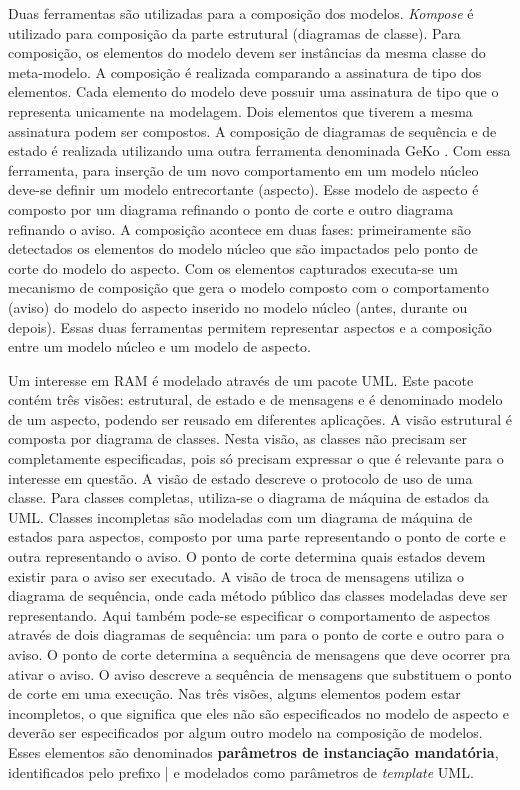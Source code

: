 Duas ferramentas são utilizadas para a composição dos modelos. \textit{Kompose} \cite{kompose:07} é utilizado para composição da parte estrutural
(diagramas de classe). Para composição, os elementos do modelo devem ser instâncias da mesma classe do meta-modelo. A composição é realizada
comparando a assinatura de tipo dos elementos. Cada elemento do modelo deve possuir uma assinatura de tipo que o representa unicamente na modelagem.
Dois elementos que tiverem a mesma assinatura podem ser compostos. A composição de diagramas de sequência e de estado é realizada utilizando uma outra
ferramenta denominada GeKo \cite{geko:08}. Com essa ferramenta, para inserção de um novo comportamento em um modelo núcleo deve-se definir um modelo 
entrecortante (aspecto). Esse modelo de aspecto é composto por um diagrama refinando o ponto de corte e outro diagrama refinando o aviso. A composição
acontece em duas fases: primeiramente são detectados os elementos do modelo núcleo que são impactados pelo ponto de corte do modelo do aspecto. Com os 
elementos capturados executa-se um mecanismo de composição que gera o modelo composto com o comportamento (aviso)
do modelo do aspecto inserido no modelo núcleo (antes, durante ou depois). Essas duas ferramentas permitem representar aspectos e a composição entre
um modelo núcleo e um modelo de aspecto.

Um interesse em RAM é modelado através de um pacote UML. Este pacote contém três visões: estrutural, de estado e de mensagens e é denominado modelo de
um aspecto, podendo ser reusado em diferentes aplicações. A visão estrutural é composta por diagrama de classes. Nesta visão, as classes não precisam
ser completamente especificadas, pois só precisam expressar o que é relevante para o interesse em questão. A visão de estado descreve o protocolo de
uso de uma classe. Para classes completas, utiliza-se o diagrama de máquina de estados da UML. Classes incompletas são modeladas com um diagrama de
máquina de estados para aspectos, composto por uma parte representando o ponto de corte e outra representando o aviso. O ponto de corte determina
quais estados devem existir para o aviso ser executado. A visão de troca de mensagens utiliza o diagrama de sequência, onde cada método público das
classes modeladas deve ser representando. Aqui também pode-se especificar o comportamento de aspectos através de dois diagramas de sequência:
um para o ponto de corte e outro para o aviso. O ponto de corte determina a sequência de mensagens que deve ocorrer pra ativar o aviso. O aviso
descreve a sequência de mensagens que substituem o ponto de corte em uma execução. Nas três visões, alguns elementos podem estar incompletos, o que
significa que eles não são especificados no modelo de aspecto e deverão ser especificados por algum outro modelo na composição de modelos. Esses
elementos são denominados \textbf{parâmetros de instanciação mandatória}, identificados pelo prefixo | e modelados como parâmetros de
\textit{template} UML.

